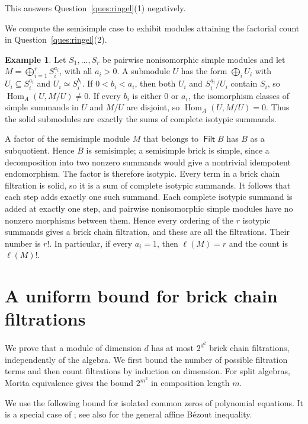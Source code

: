 \documentclass[a4paper,reqno,10pt]{amsart}
\theoremstyle{definition}
\newtheorem{example}[theorem]{Example}
\numberwithin{equation}{section}
\newcommand{\Hom}{\operatorname{Hom}}
\DeclareMathOperator{\Filt}{\mathsf{Filt}}
\begin{document}
This answers Question~\ref{ques:ringel}(1) negatively.

We compute the semisimple case to exhibit modules attaining the
factorial count in Question~\ref{ques:ringel}(2).

\begin{example}\label{ex:semisimple}
Let $S_1,\ldots,S_r$ be pairwise nonisomorphic simple modules and let
$M=\bigoplus_{i=1}^r S_i^{a_i}$, with all $a_i>0$.
A submodule $U$ has the form $\bigoplus_i U_i$ with
$U_i\subseteq S_i^{a_i}$ and $U_i\simeq S_i^{b_i}$.
If $0<b_i<a_i$, then both $U_i$ and $S_i^{a_i}/U_i$ contain $S_i$,
so $\Hom_A(U,M/U)\ne0$. If every $b_i$ is either $0$ or $a_i$,
the isomorphism classes of simple summands in $U$ and $M/U$ are
disjoint, so
$\Hom_A(U,M/U)=0$. Thus the solid submodules are exactly the sums
of complete isotypic summands.

A factor of the semisimple module $M$ that belongs to $\Filt B$ has $B$
as a subquotient. Hence $B$ is
semisimple; a semisimple brick is simple, since a decomposition into two
nonzero summands would give a nontrivial idempotent endomorphism.
The factor is therefore
isotypic. Every term in a brick chain filtration is solid, so it is a
sum of complete isotypic summands. It follows that each step adds
exactly one such summand. Each complete isotypic summand is added at
exactly one step, and pairwise nonisomorphic simple modules have no
nonzero morphisms between them. Hence every
ordering of the $r$ isotypic summands gives a brick chain filtration,
and these are all the filtrations. Their number is $r!$.
In particular, if every $a_i=1$, then $\ell(M)=r$ and the count is
$\ell(M)!$.
\end{example}

\section{A uniform bound for brick chain filtrations}\label{sec:upper}

We prove that a module of dimension $d$ has at most
$2^{d^2}$ brick chain filtrations, independently of the algebra.
We first bound the number of possible filtration terms and then count
filtrations by induction on dimension. For split algebras, Morita
equivalence gives the bound $2^{m^2}$ in composition length $m$.

We use the following bound for isolated common zeros of polynomial
equations. It is a special case of \cite[Theorem~5]{TaoBezout};
see also \cite[Theorem~1]{Heintz} for the general affine B\'ezout
inequality.
\end{document}
